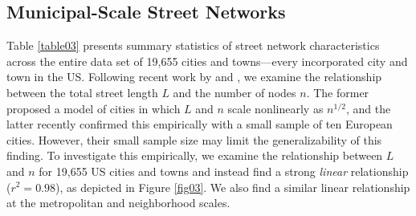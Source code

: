 \documentclass{article}
\begin{document}
\subsection{Municipal-Scale Street Networks}

Table \ref{table03} presents summary statistics of street network characteristics across the entire data set of 19,655 cities and towns---every incorporated city and town in the US. Following recent work by \citet{barthelemy_modeling_2008} and \citet{strano_urban_2013}, we examine the relationship between the total street length $L$ and the number of nodes $n$. The former proposed a model of cities in which $L$ and $n$ scale nonlinearly as $n^{1/2}$, and the latter recently confirmed this empirically with a small sample of ten European cities. However, their small sample size may limit the generalizability of this finding. To investigate this empirically, we examine the relationship between $L$ and $n$ for 19,655 US cities and towns and instead find a strong \emph{linear} relationship ($r^{2}=0.98$), as depicted in Figure \ref{fig03}. We also find a similar linear relationship at the metropolitan and neighborhood scales.
\end{document}
